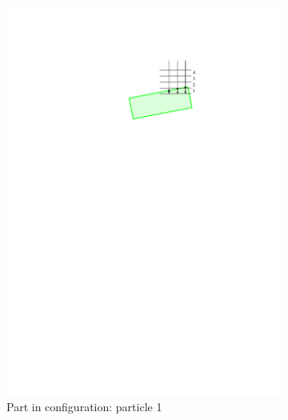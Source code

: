 \documentclass[../thesis.tex]{subfiles}
\begin{document}
\begin{figure}
    \hfill
    \begin{subfigure}[b]{0.2\linewidth}
        \includegraphics[width=\textwidth, clip, trim=4.2in 8.4in 2.5in 1.7in]{./Localization/bins_p1}
        \caption{Part in configuration: particle 1}
        \label{bins:p1}
    \end{subfigure}
    \hfill
    \begin{subfigure}[b]{0.2\linewidth}

\end{subfigure}
\end{figure}
\end{document}
